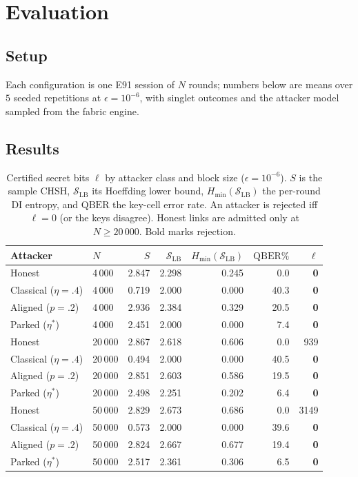 \documentclass[11pt,a4paper]{article}
\newcommand{\eps}{\epsilon}
\newcommand{\QBER}{\mathrm{QBER}}
\newcommand{\SLB}{\mathcal{S}_{\mathrm{LB}}}
\newcommand{\bits}{\ell}
\theoremstyle{plain}
\theoremstyle{definition}
\begin{document}
\section{Evaluation}\label{sec:eval}
\subsection{Setup}
Each configuration is one E91 session of $N$ rounds; numbers below are means
over $5$ seeded repetitions at $\eps=10^{-6}$, with singlet outcomes and the
attacker model sampled from the fabric engine.

\subsection{Results}
\begin{table}[t]
\centering
\caption{Certified secret bits $\bits$ by attacker class and block size
($\eps=10^{-6}$). $S$ is the sample CHSH, $\SLB$ its Hoeffding lower bound,
$H_{\min}(\SLB)$ the per-round DI entropy, and $\QBER$ the key-cell error rate.
An attacker is rejected iff $\bits=0$ (or the keys disagree). Honest links are
admitted only at $N\ge 20\,000$. Bold marks rejection.}
\label{tab:main}
\small
\begin{tabular}{llrrrrr}
\toprule
Attacker & $N$ & $S$ & $\SLB$ & $H_{\min}(\SLB)$ & $\QBER\%$ & $\bits$ \\
\midrule
Honest          & 4\,000  & 2.847 & 2.298 & 0.245 & 0.0 & \textbf{0} \\
Classical ($\eta{=}.4$) & 4\,000  & 0.719 & 2.000 & 0.000 & 40.3 & \textbf{0} \\
Aligned ($p{=}.2$)      & 4\,000  & 2.936 & 2.384 & 0.329 & 20.5 & \textbf{0} \\
Parked ($\eta^{\ast}$)  & 4\,000  & 2.451 & 2.000 & 0.000 & 7.4  & \textbf{0} \\
\midrule
Honest          & 20\,000 & 2.867 & 2.618 & 0.606 & 0.0 & 939 \\
Classical ($\eta{=}.4$) & 20\,000 & 0.494 & 2.000 & 0.000 & 40.5 & \textbf{0} \\
Aligned ($p{=}.2$)      & 20\,000 & 2.851 & 2.603 & 0.586 & 19.5 & \textbf{0} \\
Parked ($\eta^{\ast}$)  & 20\,000 & 2.498 & 2.251 & 0.202 & 6.4  & \textbf{0} \\
\midrule
Honest          & 50\,000 & 2.829 & 2.673 & 0.686 & 0.0 & 3149 \\
Classical ($\eta{=}.4$) & 50\,000 & 0.573 & 2.000 & 0.000 & 39.6 & \textbf{0} \\
Aligned ($p{=}.2$)      & 50\,000 & 2.824 & 2.667 & 0.677 & 19.4 & \textbf{0} \\
Parked ($\eta^{\ast}$)  & 50\,000 & 2.517 & 2.361 & 0.306 & 6.5  & \textbf{0} \\
\bottomrule
\end{tabular}
\end{table}
\end{document}
